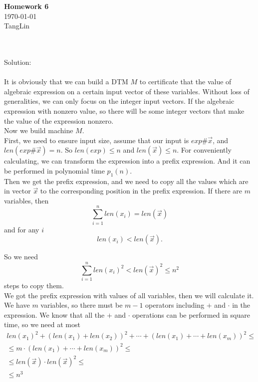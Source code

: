 \documentclass[a4papper]{article}
\theoremstyle{neosn}
\begin{document}
    \begin{center}
    {\bf Homework 6} \\
        \today \\
        TangLin
    \end{center}

    \\
    \\
    Solution: \\
    \\
    It is obviously that we can build a DTM $M$ to certificate that the value of algebraic expression
    on a certain input vector of these variables.
    Without loss of generalities, we can only focus on the integer input vectors.
    If the algebraic expression with nonzero value, so there will be some integer vectors that make
    the value of the expression nonzero. \\

    Now we build machine $M$. \\

    First, we need to ensure input size, assume that our input is $exp\#\vec{x}$, and $len(exp \# \vec{x}) = n$.
    So $len(exp) \leqslant n$ and $len(\vec{x}) \leqslant n$.
    For conveniently calculating, we can transform the expression into a prefix expression.
    And it can be performed in polynomial time $p_1(n)$. \\
    Then we get the prefix expression, and we need to copy all the values which are in vector $\vec{x}$
    to the corresponding position in the prefix expression.
    If there are $m$ variables, then
    \[
        \sum_{i=1}^n len(x_i) = len(\vec{x})
    \]
    and for any $i$
    \[
        len(x_i) < len(\vec{x}).
    \]

    So we need
    \[
        \sum_{i=1}^n len(x_i)^2 < len(\vec{x})^2 \leqslant n^2
    \]
    steps to copy them. \\

    We got the prefix expression with values of all variables, then we will calculate it.
    We have $m$ variables, so there must be $m-1$ operators including $+$ and $\cdot$ in
    the expression.
    We know that all the $+$ and $\cdot$ operations can be performed in square time, so
    we need at most
    \[
        \begin{array}{l}
            len(x_1)^2 + (len(x_1)+len(x_2))^2 + \cdots + (len(x_1)+\cdots + len(x_m))^2 \leqslant \\
            \leqslant m \cdot (len(x_1)+\cdots + len(x_m))^2 \leqslant \\
            \leqslant len(\vec{x}) \cdot len(\vec{x})^2 \leqslant \\
            \leqslant n^3
        \end{array}

    \]
\end{document}
